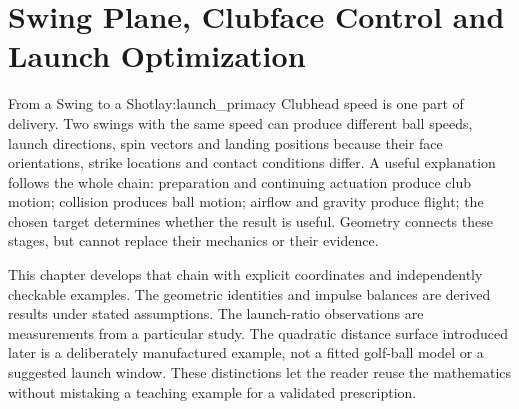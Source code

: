 \chapter{Swing Plane, Clubface Control and Launch Optimization}
\label{ch:swing_plane_launch}

\begin{laymansbox}{From a Swing to a Shot}{lay:launch_primacy}
Clubhead speed is one part of delivery. Two swings with the same speed can
produce different ball speeds, launch directions, spin vectors and landing
positions because their face orientations, strike locations and contact
conditions differ. A useful explanation follows the whole chain: preparation
and continuing actuation produce club motion; collision produces ball motion;
airflow and gravity produce flight; the chosen target determines whether the
result is useful. Geometry connects these stages, but cannot replace their
mechanics or their evidence.
\end{laymansbox}

This chapter develops that chain with explicit coordinates and independently
checkable examples. The geometric identities and impulse balances are derived
results under stated assumptions. The launch-ratio observations are measurements
from a particular study. The quadratic distance surface introduced later is a
deliberately manufactured example, not a fitted golf-ball model or a suggested
launch window. These distinctions let the reader reuse the mathematics without
mistaking a teaching example for a validated prescription.


